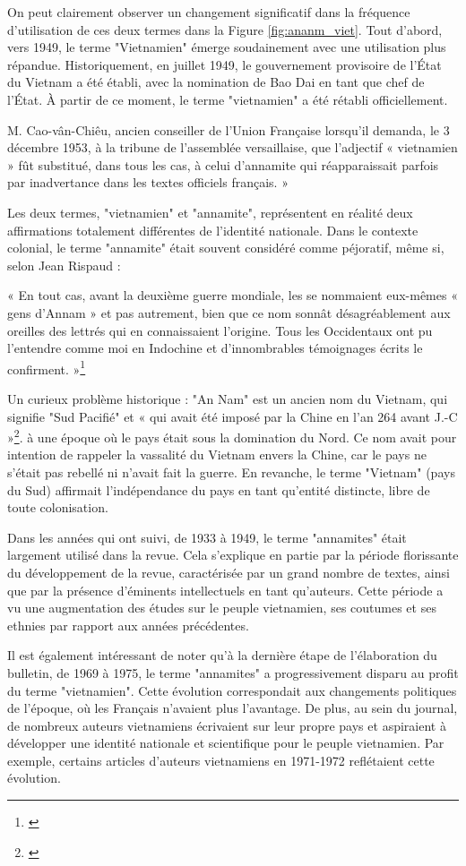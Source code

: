 On peut clairement observer un changement significatif dans la fréquence d'utilisation de ces deux termes dans la Figure \ref{fig:ananm_viet}. Tout d'abord, vers 1949, le terme "Vietnamien" émerge soudainement avec une utilisation plus répandue. Historiquement, en juillet 1949, le gouvernement provisoire de l'État du Vietnam a été établi, avec la nomination de Bao Dai en tant que chef de l'État. À partir de ce moment, le terme "vietnamien" a été rétabli officiellement. 

M. Cao-vân-Chiêu, ancien conseiller de l'Union Française lorsqu'il demanda, le 3 décembre 1953, à la tribune de l'assemblée versaillaise, que l'adjectif « vietnamien » fût substitué, dans tous les cas, à celui d'annamite qui réapparaissait parfois par inadvertance dans les textes officiels français. » 

Les deux termes, "vietnamien" et "annamite", représentent en réalité deux affirmations totalement différentes de l'identité nationale. Dans le contexte colonial, le terme "annamite" était souvent considéré comme péjoratif, même si, selon Jean Rispaud : 

« En tout cas, avant la deuxième guerre mondiale, les se nommaient eux-mêmes « gens d'Annam » et pas autrement, bien que ce nom sonnât désagréablement aux oreilles des lettrés qui en connaissaient l'origine. Tous les Occidentaux ont pu l'entendre comme moi en Indochine et d'innombrables témoignages écrits le confirment. »\footnote{\cite{vietnam}}

Un curieux problème historique : 
"An Nam" est un ancien nom du Vietnam, qui signifie "Sud Pacifié" et « qui avait été imposé par la Chine  en l'an 264 avant J.-C »\footnote{\cite{vietnam}}. à une époque où le pays était sous la domination du Nord. Ce nom avait pour intention de rappeler la vassalité du Vietnam envers la Chine, car le pays ne s'était pas rebellé ni n'avait fait la guerre. En revanche, le terme "Vietnam" (pays du Sud) affirmait l'indépendance du pays en tant qu'entité distincte, libre de toute colonisation.

Dans les années qui ont suivi, de 1933 à 1949, le terme "annamites" était largement utilisé dans la revue. Cela s'explique en partie par la période florissante du développement de la revue, caractérisée par un grand nombre de textes, ainsi que par la présence d'éminents intellectuels en tant qu'auteurs. Cette période a vu une augmentation des études sur le peuple vietnamien, ses coutumes et ses ethnies par rapport aux années précédentes.

Il est également intéressant de noter qu'à la dernière étape de l'élaboration du bulletin, de 1969 à 1975, le terme "annamites" a progressivement disparu au profit du terme "vietnamien". Cette évolution correspondait aux changements politiques de l'époque, où les Français n'avaient plus l'avantage. De plus, au sein du journal, de nombreux auteurs vietnamiens écrivaient sur leur propre pays et aspiraient à développer une identité nationale et scientifique pour le peuple vietnamien. Par exemple, certains articles d'auteurs vietnamiens en 1971-1972 reflétaient cette évolution.

